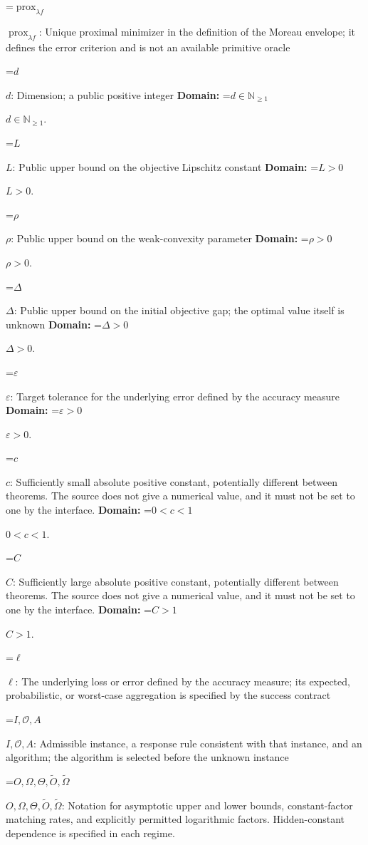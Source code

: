 \documentclass[10pt,a4paper]{article}
\newcommand{\AtlasMath}[1]{\par\begingroup\centering\setbox0=\hbox{$\displaystyle #1$}\ifdim\wd0>1.4\linewidth\typeout{ATLAS WIDE FORMULA: \the\wd0}\fi\ifdim\wd0>\linewidth\resizebox{\linewidth}{!}{\box0}\else\box0\fi\par\endgroup}
\newcommand{\AtlasInlineMath}[1]{\begingroup\setbox0=\hbox{$#1$}\ifdim\wd0>.4\linewidth\endgroup\AtlasMath{#1}\else\endgroup$#1$\fi}
\begin{document}
\AtlasInlineMath{\operatorname{prox}_{\lambda f}}: Unique proximal minimizer in the definition of the Moreau envelope; it defines the error criterion and is not an available primitive oracle



\AtlasInlineMath{d}: Dimension; a public positive integer \textbf{Domain:} \AtlasInlineMath{d\in\mathbb{N}_{\ge1}}.



\AtlasInlineMath{L}: Public upper bound on the objective Lipschitz constant \textbf{Domain:} \AtlasInlineMath{L>0}.



\AtlasInlineMath{\rho}: Public upper bound on the weak-convexity parameter \textbf{Domain:} \AtlasInlineMath{\rho>0}.



\AtlasInlineMath{\Delta}: Public upper bound on the initial objective gap; the optimal value itself is unknown \textbf{Domain:} \AtlasInlineMath{\Delta>0}.



\AtlasInlineMath{\varepsilon}: Target tolerance for the underlying error defined by the accuracy measure \textbf{Domain:} \AtlasInlineMath{\varepsilon>0}.



\AtlasInlineMath{c}: Sufficiently small absolute positive constant, potentially different between theorems. The source does not give a numerical value, and it must not be set to one by the interface. \textbf{Domain:} \AtlasInlineMath{0<c<1}.



\AtlasInlineMath{C}: Sufficiently large absolute positive constant, potentially different between theorems. The source does not give a numerical value, and it must not be set to one by the interface. \textbf{Domain:} \AtlasInlineMath{C>1}.



\AtlasInlineMath{\ell}: The underlying loss or error defined by the accuracy measure; its expected, probabilistic, or worst-case aggregation is specified by the success contract



\AtlasInlineMath{I,\mathcal{O},A}: Admissible instance, a response rule consistent with that instance, and an algorithm; the algorithm is selected before the unknown instance



\AtlasInlineMath{O,\Omega,\Theta,\widetilde{O},\widetilde\Omega}: Notation for asymptotic upper and lower bounds, constant-factor matching rates, and explicitly permitted logarithmic factors. Hidden-constant dependence is specified in each regime.
\end{document}
